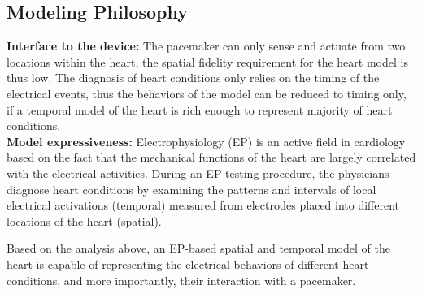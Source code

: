 \documentclass[openany]{now} %
\begin{document}
\subsection{Modeling Philosophy}

\textbf{Interface to the device: }The pacemaker can only sense and actuate from two locations within the heart, the spatial fidelity requirement for the heart model is thus low. The diagnosis of heart conditions only relies on the timing of the electrical events, thus the behaviors of the model can be reduced to timing only, if a temporal model of the heart is rich enough to represent majority of heart conditions. \\
\textbf{Model expressiveness: }Electrophysiology (EP) is an active field in cardiology based on the fact that the mechanical functions of the heart are largely correlated with the electrical activities. During an EP testing procedure, the physicians diagnose heart conditions by examining the patterns and intervals of local electrical activations (temporal) measured from electrodes placed into different locations of the heart (spatial). 

Based on the analysis above, an EP-based spatial and temporal model of the heart is capable of representing the electrical behaviors of different heart conditions, and more importantly, their interaction with a pacemaker. 
\end{document}
